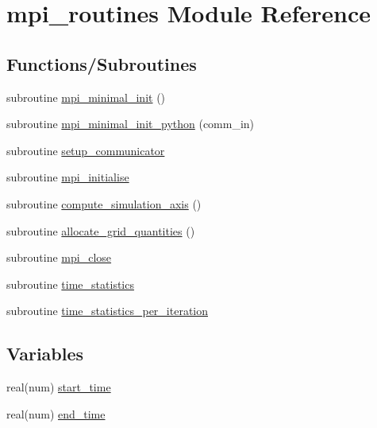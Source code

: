 \hypertarget{namespacempi__routines}{}\section{mpi\+\_\+routines Module Reference}
\label{namespacempi__routines}
\subsection*{Functions/\+Subroutines}
\begin{DoxyCompactItemize}
\item 
subroutine \hyperlink{namespacempi__routines_a61438ec53719149e70d0600171070933}{mpi\+\_\+minimal\+\_\+init} ()
\item 
subroutine \hyperlink{namespacempi__routines_a207f6d765479d24553ae1186200a5d9d}{mpi\+\_\+minimal\+\_\+init\+\_\+python} (comm\+\_\+in)
\item 
subroutine \hyperlink{namespacempi__routines_a32b858516b2e2b02580cf4ce8cb40ccc}{setup\+\_\+communicator}
\item 
subroutine \hyperlink{namespacempi__routines_a2574986e9474b6d4144f099df814e257}{mpi\+\_\+initialise}
\item 
subroutine \hyperlink{namespacempi__routines_ac6bf7d666673e87855069981a4a664d5}{compute\+\_\+simulation\+\_\+axis} ()
\item 
subroutine \hyperlink{namespacempi__routines_a483f086b039961c1b48127fc9d81cf65}{allocate\+\_\+grid\+\_\+quantities} ()
\item 
subroutine \hyperlink{namespacempi__routines_ab1a2d976a5017905d06e301f5af07ad2}{mpi\+\_\+close}
\item 
subroutine \hyperlink{namespacempi__routines_a39928834ab9f9c980ffc2e7849cf8af3}{time\+\_\+statistics}
\item 
subroutine \hyperlink{namespacempi__routines_aae81751f0f074a5eba4ddc0126bfd5cd}{time\+\_\+statistics\+\_\+per\+\_\+iteration}
\end{DoxyCompactItemize}
\subsection*{Variables}
\begin{DoxyCompactItemize}
\item 
real(num) \hyperlink{namespacempi__routines_aa3f567f6443fe088b81d3fb43509a45c}{start\+\_\+time}
\item 
real(num) \hyperlink{namespacempi__routines_a4b0b516f93006e24d942b3f124cb82d4}{end\+\_\+time}
\end{DoxyCompactItemize}


